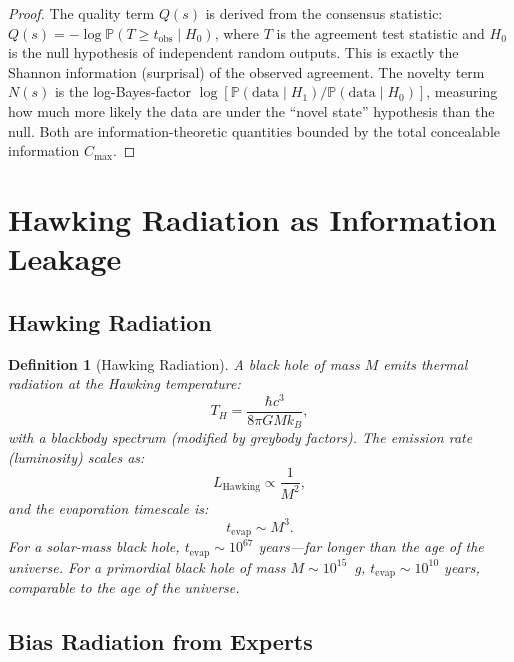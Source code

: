\documentclass[12pt,a4paper]{article}
\newtheorem{definition}[theorem]{Definition}
\theoremstyle{remark}
\newcommand{\Pbb}{\mathbb{P}}
\begin{document}
\begin{proof}
The quality term $Q(s)$ is derived from the consensus statistic: $Q(s) = -\log \Pbb(T \geq t_{\text{obs}} \mid H_0)$, where $T$ is the agreement test statistic and $H_0$ is the null hypothesis of independent random outputs. This is exactly the Shannon information (surprisal) of the observed agreement. The novelty term $N(s)$ is the log-Bayes-factor $\log [\Pbb(\text{data} \mid H_1) / \Pbb(\text{data} \mid H_0)]$, measuring how much more likely the data are under the ``novel state'' hypothesis than the null. Both are information-theoretic quantities bounded by the total concealable information $C_{\max}$.
\end{proof}


\section{Hawking Radiation as Information Leakage}
\label{sec:hawking}

\subsection{Hawking Radiation}

\begin{definition}[Hawking Radiation]
\label{def:hawking_radiation}
A black hole of mass $M$ emits thermal radiation at the Hawking temperature:
\begin{equation}
  T_H = \frac{\hbar c^3}{8\pi G M k_B},
\end{equation}
with a blackbody spectrum (modified by greybody factors). The emission rate (luminosity) scales as:
\begin{equation}
  L_{\text{Hawking}} \propto \frac{1}{M^2},
\end{equation}
and the evaporation timescale is:
\begin{equation}
  t_{\text{evap}} \sim M^3.
\end{equation}
For a solar-mass black hole, $t_{\text{evap}} \sim 10^{67}$ years---far longer than the age of the universe. For a primordial black hole of mass $M \sim 10^{15}$~g, $t_{\text{evap}} \sim 10^{10}$ years, comparable to the age of the universe.
\end{definition}

\subsection{Bias Radiation from Experts}
\end{document}
